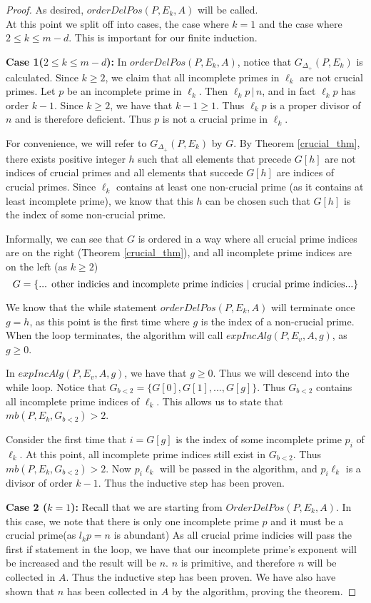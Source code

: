 \documentclass[../paper.tex]{subfiles}
\begin{document}
\begin{proof}
As desired, $orderDelPos(P, E_k, A)$ will be called.
\\
 
At this point we split off into cases, the case
where $k = 1$ and the case where $2 \leq k \leq m - d$. This is
important for our finite induction.

\textbf{Case 1($2 \leq k \leq m - d$):} In $orderDelPos(P, E_k, A)$, notice 
that $G_{\Delta_+}(P,E_k)$ is calculated. Since $k \geq 2$, we claim that
all incomplete primes in $\ell_k$ are not crucial primes.
Let $p$ be an incomplete prime in $\ell_k$. Then $\ell_k p \, |\, n$,
and in fact $\ell_k p$ has order $k - 1$. Since $k \geq 2$, we
have that $k - 1 \geq 1$. Thus $\ell_k p$ is a proper divisor of
$n$ and is therefore deficient. Thus $p$ is not a crucial prime in
$\ell_k$.

For convenience, we will refer to $G_{\Delta_+}(P,E_k)$ by $G$. By 
Theorem {\ref{crucial_thm}}, there exists positive integer $h$ such that
all elements that precede $G[h]$ are not indices of crucial primes
and all elements that succede $G[h]$ are indices of crucial
primes. Since $\ell_k$ contains at least one non-crucial prime (as
it contains at least incomplete prime), we know that this $h$ can
be chosen such that $G[h]$ is the index of some non-crucial prime.

Informally, we can see that $G$ is ordered in a way where all 
crucial prime indices are on the right (Theorem {\ref{crucial_thm}}), 
and all incomplete prime indices are on the left (as $k \geq 2$)
%
$$ G = \{ \text{... other indicies and incomplete prime indicies 
$ | $ crucial prime indicies...} \} $$

We know that the while statement
$orderDelPos(P, E_k, A)$ will terminate once $g = h$, as this point is the
first time where $g$ is the index of a non-crucial prime. When
the loop terminates, the algorithm will call $expIncAlg(P,E_v, A,
g)$, as $g \geq 0$. 

In $expIncAlg(P,E_v,A, g)$, we have that $g \geq 0$. Thus we will
descend into the while loop. Notice that $G_{b<2} = \{G[0], G[1], 
..., G[g]\}$. Thus $G_{b<2}$ contains all incomplete prime indices
of $\ell_k$. This allows us to state that $mb(P,E_k, G_{b<2}) > 2$.

Consider the first time that $i = G[g]$ is the index of some
incomplete prime $p_i$ of $\ell_k$. At this point, 
all incomplete prime indices still exist in $G_{b<2}$. 
Thus $mb(P, E_k, G_{b<2}) > 2$. 
Now $p_i \ell_k$ will be passed in the algorithm, and $p_i \ell_k$
is a divisor of order $k-1$. Thus the inductive step has been proven.

\textbf{Case 2 ($k = 1$):} Recall that we are starting from $OrderDelPos(P,
E_k, A)$. In this case, we note that there is only one incomplete prime 
$p$ and it must be a crucial prime(as $l_k p = n$ is abundant)
As all crucial prime indicies will pass the first if statement in the 
loop, we have that our incomplete prime's exponent will be 
increased and the result will be $n$. $n$ is primitive, and
therefore $n$ will be collected in $A$. Thus the inductive step has 
been proven. We have also have shown that $n$ has been
collected in $A$ by the algorithm, proving the theorem.
\end{proof}
\end{document}
